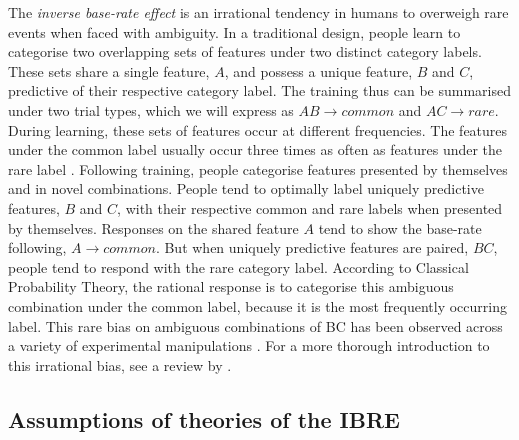 \documentclass[10pt,letterpaper]{article}
\begin{document}
The \textit{inverse base-rate effect} \cite<IBRE, >{medin1988problem} is an irrational tendency in humans to overweigh rare events when faced with ambiguity.
In a traditional design, people learn to categorise two overlapping sets of features under two distinct category labels.
These sets share a single feature, $A$, and possess a unique feature, $B$ and $C$, predictive of their respective category label.
The training thus can be summarised under two trial types, which we will express as $AB \to common$ and $AC \to rare$.
During learning, these sets of features occur at different frequencies.
The features under the common label usually occur three times as often as features under the rare label \cite{kruschke1996base}.
Following training, people categorise features presented by themselves and in novel combinations.
People tend to optimally label uniquely predictive features, $B$ and $C$, with their respective common and rare labels when presented by themselves.
Responses on the shared feature $A$ tend to show the base-rate following, $A \to common$.
But when uniquely predictive features are paired, $BC$, people tend to respond with the rare category label.
According to Classical Probability Theory, the rational response is to categorise this ambiguous combination under the common label, because it is the most frequently occurring label.
This rare bias on ambiguous combinations of BC has been observed across a variety of experimental manipulations \cite{kalish2001inverse,don2017effects,don2021attention,inkster2022effect,wills2014attention}.
For a more thorough introduction to this irrational bias, see a review by .

\subsection{Assumptions of theories of the IBRE}
\end{document}
